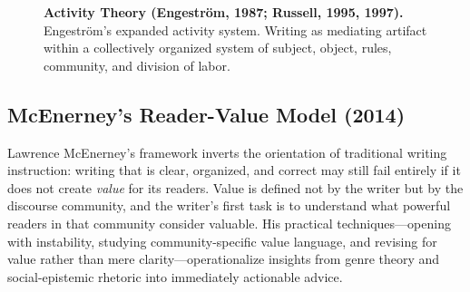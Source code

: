 \documentclass[12pt]{article}
\begin{document}
\begin{figure}[H]
\caption{\textbf{Activity Theory (Engestr\"{o}m, 1987; Russell, 1995, 1997).} Engestr\"{o}m's expanded activity system. Writing as mediating artifact within a collectively organized system of subject, object, rules, community, and division of labor.}
\label{fig:activity-model}
\end{figure}

\subsection{McEnerney's Reader-Value Model (2014)}

Lawrence McEnerney's framework inverts the orientation of traditional writing instruction: writing that is clear, organized, and correct may still fail entirely if it does not create \textit{value} for its readers. Value is defined not by the writer but by the discourse community, and the writer's first task is to understand what powerful readers in that community consider valuable. His practical techniques---opening with instability, studying community-specific value language, and revising for value rather than mere clarity---operationalize insights from genre theory and social-epistemic rhetoric into immediately actionable advice.
\end{document}
